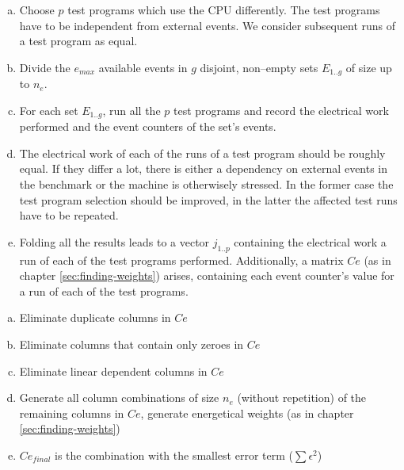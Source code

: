 \begin{enumerate}[(a)]

\item Choose $p$ test programs which use the CPU differently. The test
programs have to be independent from external events. We consider subsequent
runs of a test program as equal.

\item Divide the $e_{max}$ available events in $g$ disjoint, non--empty sets
$E_{1..g}$ of size up to $n_e$.

\item For each set $E_{1..g}$, run all the $p$ test programs and record the
electrical work performed and the event counters of the set's events.

\item The electrical work of each of the runs of a test program should be
roughly equal. If they differ a lot, there is either a dependency on external
events in the benchmark or the machine is otherwisely stressed. In the former
case the test program selection should be improved, in the latter the affected
test runs have to be repeated.

\item Folding all the results leads to a vector $j_{1..p}$ containing the
electrical work a run of each of the test programs performed. Additionally, a
matrix $Ce$ (as in chapter \ref{sec:finding-weights}) arises, containing each
event counter's value for a run of each of the test programs.

\end{enumerate}


\begin{enumerate}[(a)]

\item Eliminate duplicate columns in $Ce$

\item Eliminate columns that contain only zeroes in $Ce$

\item Eliminate linear dependent columns in $Ce$

\item Generate all column combinations of size $n_e$ (without repetition) of the
remaining columns in $Ce$, generate energetical weights (as in chapter
\ref{sec:finding-weights})

\item $Ce_{final}$ is the combination with the smallest error term
($\sum\epsilon^2$)

\end{enumerate}

